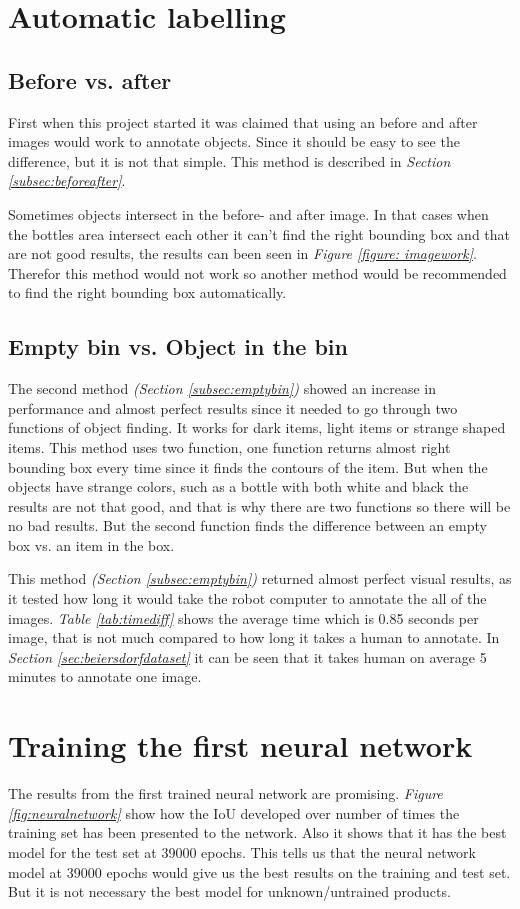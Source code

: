 \section{Automatic labelling}
\subsection{Before vs. after}
First when this project started it was claimed that using an before and after images would work to annotate objects. Since it should be easy to see the difference, but it is not that simple. This method is described in \textit{Section \ref{subsec:beforeafter}}.

Sometimes objects intersect in the before- and after image. In that cases when the bottles area intersect each other it can't find the right bounding box and that are not good results, the results can been seen in \textit{Figure \ref{figure: imagework}}. Therefor this method would not work so another method would be recommended to find the right bounding box automatically. 

\subsection{Empty bin vs. Object in the bin}
The second method \textit{(Section \ref{subsec:emptybin})} showed an increase in performance and almost perfect results since it needed to go through two functions of object finding. It works for dark items, light items or strange shaped items. This method uses two function, one function returns almost right bounding box every time since it finds the contours of the item. But when the objects have strange colors, such as a bottle with both white and black the results are not that good, and that is why there are two functions so there will be no bad results. But the second function finds the difference between an empty box vs. an item in the box.

This method \textit{(Section \ref{subsec:emptybin})} returned almost perfect visual results, as it tested how long it would take the robot computer to annotate the all of the images. \textit{Table \ref{tab:timediff}} shows the average time which is 0.85 seconds per image, that is not much compared to how long it takes a human to annotate. In \textit{Section \ref{sec:beiersdorfdataset}} it can be seen that it takes human on average 5 minutes to annotate one image.


\section{Training the first neural network}
The results from the first trained neural network are promising. \textit{Figure \ref{fig:neuralnetwork}} show how the IoU developed over number of times the training set has been presented to the network. Also it shows that it has the best model for the test set at 39000 epochs. This tells us that the neural network model at 39000 epochs would give us the best results on the training and test set. But it is not necessary the best model for unknown/untrained products.

